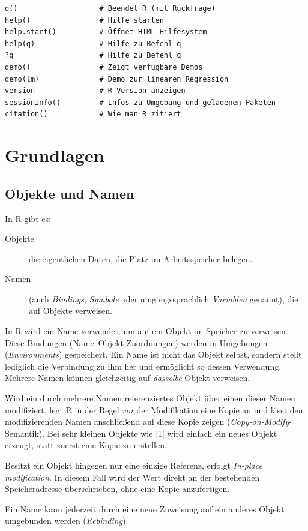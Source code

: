 \documentclass[10pt,twocolumn]{scrartcl}
\renewcommand{\lstinline}{\mycoloredinline}
\begin{document}
\begin{lstlisting}
q()                   # Beendet R (mit Rückfrage)
help()                # Hilfe starten
help.start()          # Öffnet HTML-Hilfesystem
help(q)               # Hilfe zu Befehl q
?q                    # Hilfe zu Befehl q
demo()                # Zeigt verfügbare Demos
demo(lm)              # Demo zur linearen Regression
version               # R-Version anzeigen
sessionInfo()         # Infos zu Umgebung und geladenen Paketen
citation()            # Wie man R zitiert
\end{lstlisting}


\section{Grundlagen}

\subsection{Objekte und Namen}

In R gibt es:
\begin{description}
\item[Objekte] die eigentlichen Daten, die Platz im Arbeitsspeicher belegen.
\item[Namen] (auch \emph{Bindings}, \emph{Symbole} oder umgangssprachlich \emph{Variablen} genannt), die auf Objekte verweisen.
\end{description}
In R wird ein Name verwendet, um auf ein Objekt im Speicher zu verweisen. Diese Bindungen (Name–Objekt-Zuordnungen) werden in Umgebungen (\emph{Environments}) gespeichert. Ein Name ist nicht das Objekt selbst, sondern stellt lediglich die Verbindung zu ihm her und ermöglicht so dessen Verwendung. Mehrere Namen können gleichzeitig auf \emph{dasselbe} Objekt verweisen.

Wird ein durch mehrere Namen referenziertes Objekt über einen dieser Namen modifiziert, legt R in der Regel \emph{vor} der Modifikation eine Kopie an und lässt den modifizierenden Namen anschließend auf diese Kopie zeigen (\emph{Copy-on-Modify}-Semantik).
Bei sehr kleinen Objekte wie \lstinline|1| wird einfach ein neues Objekt erzeugt, statt zuerst eine Kopie zu erstellen.

Besitzt ein Objekt hingegen nur eine einzige Referenz, erfolgt \emph{In-place modification}. In diesem Fall wird der Wert direkt an der bestehenden Speicheradresse überschrieben, ohne eine Kopie anzufertigen.

Ein Name kann jederzeit durch eine neue Zuweisung auf ein anderes Objekt umgebunden werden (\emph{Rebinding}).
\end{document}
